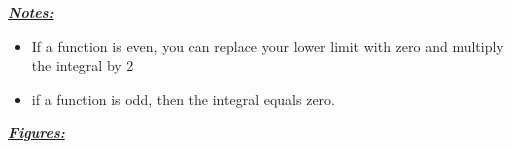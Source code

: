 \documentclass{report}
\begin{document}
      \bigbreak \noindent \bigbreak \noindent
      \textbf{\textit{\underline{Notes:}}}
      \begin{itemize}
        \item If a function is even, you can replace your lower limit with zero and multiply the integral by 2
        \item if a function is odd, then the integral equals zero.
      \end{itemize}

      \bigbreak \noindent \bigbreak \noindent
      \textbf{\textit{\underline{Figures:}}}
      \begin{figure}[ht]
          \centering
          \label{fig:fig1even}
      \end{figure}

      \pagebreak \bigbreak \noindent
\end{document}

